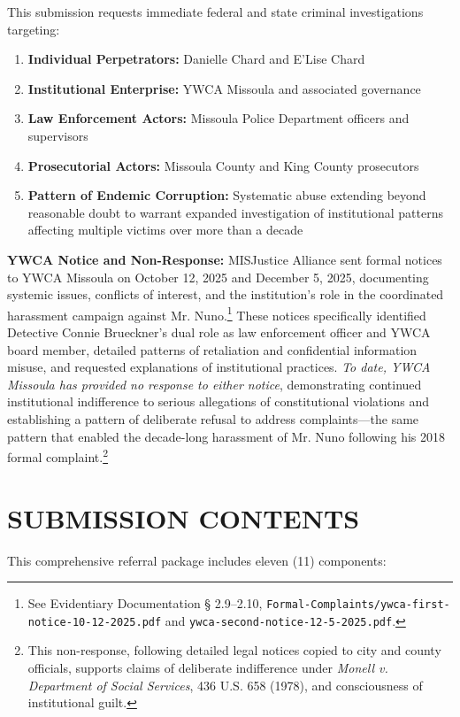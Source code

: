 \documentclass[12pt,oneside]{article}
\begin{document}
This submission requests immediate federal and state criminal investigations targeting:

\begin{enumerate}
\item \textbf{Individual Perpetrators:} Danielle Chard and E'Lise Chard
\item \textbf{Institutional Enterprise:} YWCA Missoula and associated governance
\item \textbf{Law Enforcement Actors:} Missoula Police Department officers and supervisors
\item \textbf{Prosecutorial Actors:} Missoula County and King County prosecutors
\item \textbf{Pattern of Endemic Corruption:} Systematic abuse extending beyond reasonable doubt to warrant expanded investigation of institutional patterns affecting multiple victims over more than a decade
\end{enumerate}

\textbf{YWCA Notice and Non-Response:} MISJustice Alliance sent formal notices to YWCA Missoula on October 12, 2025 and December 5, 2025, documenting systemic issues, conflicts of interest, and the institution's role in the coordinated harassment campaign against Mr. Nuno.\footnote{See Evidentiary Documentation \S{} 2.9--2.10, \texttt{Formal-Complaints/ywca-first-notice-10-12-2025.pdf} and \texttt{ywca-second-notice-12-5-2025.pdf}.} These notices specifically identified Detective Connie Brueckner's dual role as law enforcement officer and YWCA board member, detailed patterns of retaliation and confidential information misuse, and requested explanations of institutional practices. \textit{To date, YWCA Missoula has provided no response to either notice}, demonstrating continued institutional indifference to serious allegations of constitutional violations and establishing a pattern of deliberate refusal to address complaints---the same pattern that enabled the decade-long harassment of Mr. Nuno following his 2018 formal complaint.\footnote{This non-response, following detailed legal notices copied to city and county officials, supports claims of deliberate indifference under \textit{Monell v. Department of Social Services}, 436 U.S. 658 (1978), and consciousness of institutional guilt.}

\section*{SUBMISSION CONTENTS}

This comprehensive referral package includes eleven (11) components:
\end{document}
